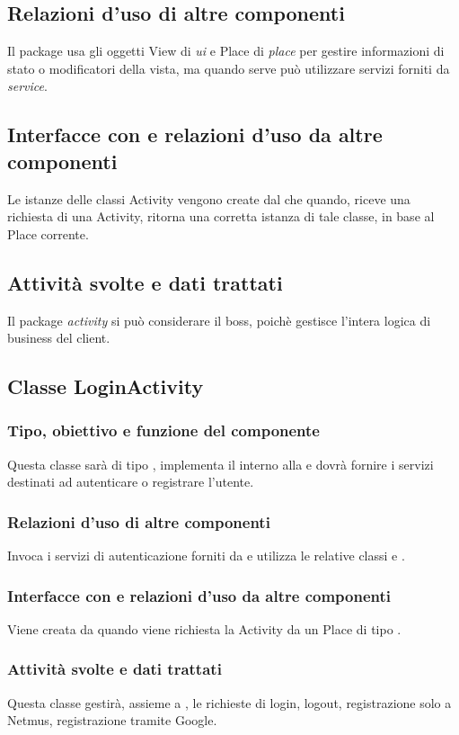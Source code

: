 \subsection*{Relazioni d'uso di altre componenti}
Il package usa gli oggetti View di \emph{ui} e Place di \emph{place} per gestire
informazioni di stato o modificatori della vista, ma quando serve pu\`o
utilizzare servizi forniti da \emph{service}.
\subsection*{Interfacce con e relazioni d'uso da altre componenti} 
Le istanze delle classi Activity vengono create dal 
che quando, riceve una richiesta di una Activity, ritorna una corretta istanza
di tale classe, in base al Place corrente.
\subsection*{Attivit\`a svolte e dati trattati}
Il package \emph{activity} si pu\`o considerare il boss, poich\`e gestisce
l'intera logica di business del client.

\subsection{Classe LoginActivity}
\subsubsection*{Tipo, obiettivo e funzione del componente}
Questa classe sar\`a di tipo , implementa il 
interno alla  e dovr\`a fornire i servizi destinati ad autenticare
o registrare l'utente.
\subsubsection*{Relazioni d'uso di altre componenti}
Invoca i servizi di autenticazione forniti da  e utilizza
le relative classi  e .
\subsubsection*{Interfacce con e relazioni d'uso da altre componenti} 
Viene creata da  quando viene richiesta la Activity da
un Place di tipo .
\subsubsection*{Attivit\`a svolte e dati trattati}
Questa classe gestir\`a, assieme a , le richieste di login,
logout, registrazione solo a Netmus, registrazione tramite Google.

